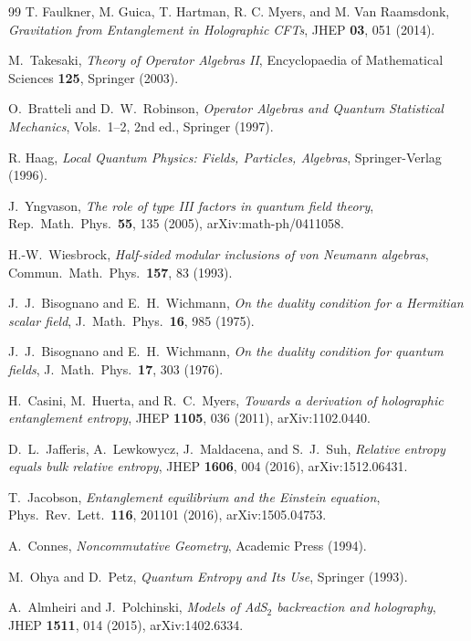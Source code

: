 \documentclass[12pt,a4paper]{article}
\begin{document}
\begin{thebibliography}{99}
T. Faulkner, M. Guica, T. Hartman, R. C. Myers, and M. Van Raamsdonk, \emph{Gravitation from Entanglement in Holographic CFTs}, JHEP \textbf{03}, 051 (2014).

M.~Takesaki, \emph{Theory of Operator Algebras II}, Encyclopaedia of Mathematical Sciences \textbf{125}, Springer (2003).

O.~Bratteli and D.~W.~Robinson, \emph{Operator Algebras and Quantum Statistical Mechanics}, Vols.\ 1--2, 2nd ed., Springer (1997).

R. Haag, \emph{Local Quantum Physics: Fields, Particles, Algebras}, Springer-Verlag (1996).

J.~Yngvason, \emph{The role of type III factors in quantum field theory}, Rep.\ Math.\ Phys.\ \textbf{55}, 135 (2005), arXiv:math-ph/0411058.

H.-W.~Wiesbrock, \emph{Half-sided modular inclusions of von Neumann algebras}, Commun.\ Math.\ Phys.\ \textbf{157}, 83 (1993).

J.~J.~Bisognano and E.~H.~Wichmann, \emph{On the duality condition for a Hermitian scalar field}, J.\ Math.\ Phys.\ \textbf{16}, 985 (1975).

J.~J.~Bisognano and E.~H.~Wichmann, \emph{On the duality condition for quantum fields}, J.\ Math.\ Phys.\ \textbf{17}, 303 (1976).

H.~Casini, M.~Huerta, and R.~C.~Myers, \emph{Towards a derivation of holographic entanglement entropy}, JHEP \textbf{1105}, 036 (2011), arXiv:1102.0440.

D.~L.~Jafferis, A.~Lewkowycz, J.~Maldacena, and S.~J.~Suh, \emph{Relative entropy equals bulk relative entropy}, JHEP \textbf{1606}, 004 (2016), arXiv:1512.06431.

T.~Jacobson, \emph{Entanglement equilibrium and the Einstein equation}, Phys.\ Rev.\ Lett.\ \textbf{116}, 201101 (2016), arXiv:1505.04753.

A.~Connes, \emph{Noncommutative Geometry}, Academic Press (1994).

M.~Ohya and D.~Petz, \emph{Quantum Entropy and Its Use}, Springer (1993).

A.~Almheiri and J.~Polchinski, \emph{Models of AdS$_2$ backreaction and holography}, JHEP \textbf{1511}, 014 (2015), arXiv:1402.6334.


\end{thebibliography}
\end{document}
